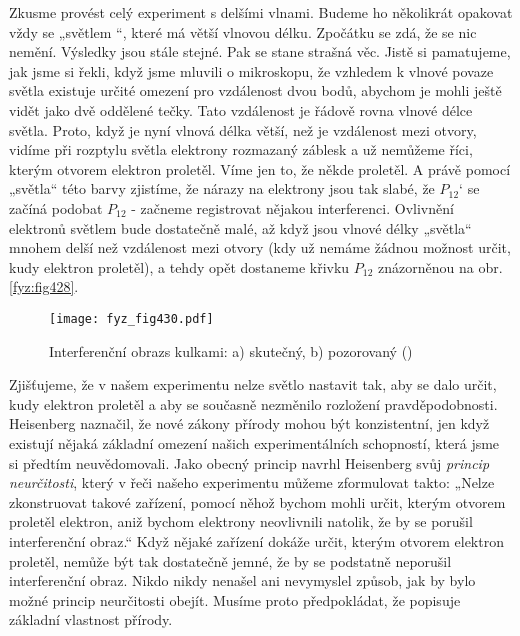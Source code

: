     Zkusme provést celý experiment s delšími vlnami. Budeme ho několikrát opakovat vždy se „světlem
    “, které má větší vlnovou délku. Zpočátku se zdá, že se nic nemění. Výsledky jsou stále stejné.
    Pak se stane strašná věc. Jistě si pamatujeme, jak jsme si řekli, když jsme mluvili o
    mikroskopu, že vzhledem k vlnové povaze světla existuje určité omezení pro vzdálenost dvou bodů,
    abychom je mohli ještě vidět jako dvě oddělené tečky. Tato vzdálenost je řádově rovna vlnové
    délce světla. Proto, když je nyní vlnová délka větší, než je vzdálenost mezi otvory, vidíme při
    rozptylu světla elektrony rozmazaný záblesk a už nemůžeme říci, kterým otvorem elektron
    proletěl. Víme jen to, že někde proletěl. A právě pomocí „světla“ této barvy zjistíme, že nárazy
    na elektrony jsou tak slabé, že \(P_{12}‘\) se začíná podobat \(P_{12}\) - začneme registrovat
    nějakou interferenci. Ovlivnění elektronů světlem bude dostatečně malé, až když jsou vlnové
    délky „světla“ mnohem delší než vzdálenost mezi otvory (kdy už nemáme žádnou možnost určit, kudy
    elektron proletěl), a tehdy opět dostaneme křivku \(P_{12}\) znázorněnou na obr.
    \ref{fyz:fig428}.

    \begin{figure}[ht!] %
      \centering
      \texttt{[image: fyz\_fig430.pdf]}
      \caption{Interferenční obrazs kulkami: a) skutečný, b) pozorovaný (\cite[s.~697]{Feynman01})}
      \label{fyz:fig430}
    \end{figure}

    Zjišťujeme, že v našem experimentu nelze světlo nastavit tak, aby se dalo určit, kudy elektron
    proletěl a aby se současně nezměnilo rozložení pravděpodobnosti. Heisenberg naznačil, že nové
    zákony přírody mohou být konzistentní, jen když existují nějaká základní omezení našich
    experimentálních schopností, která jsme si předtím neuvědomovali. Jako obecný princip navrhl
    Heisenberg svůj \emph{princip neurčitosti}, který v řeči našeho experimentu můžeme zformulovat
    takto: „Nelze zkonstruovat takové zařízení, pomocí něhož bychom mohli určit, kterým otvorem
    proletěl elektron, aniž bychom elektrony neovlivnili natolik, že by se porušil interferenční
    obraz.“ Když nějaké zařízení dokáže určit, kterým otvorem elektron proletěl, nemůže být tak
    dostatečně jemné, že by se podstatně neporušil interferenční obraz. Nikdo nikdy nenašel ani
    nevymyslel způsob, jak by bylo možné princip neurčitosti obejít. Musíme proto předpokládat, že
    popisuje základní vlastnost přírody.
    
